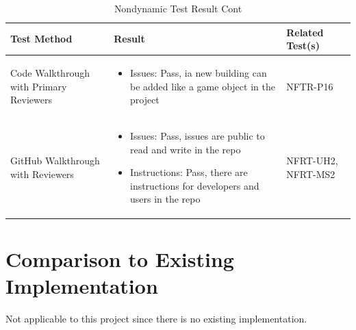 \documentclass[12pt, titlepage]{article}
\begin{document}
\begin{table}[H]
\caption{Nondynamic Test Result Cont}
\begin{tabular}{|p{0.3\linewidth} | p{0.5\linewidth}| p{0.2\linewidth} |}
\hline
\multicolumn{1}{|l}{\bfseries Test Method} & \multicolumn{1}{|l|}{\bfseries Result} & \multicolumn{1}{l|}{\bfseries Related Test(s)}\\
\hline
Code Walkthrough with Primary Reviewers & 
\begin{itemize}
\item Issues: Pass, ia new building can be added like a game object in the project
\end{itemize} & NFTR-P16\\
\hline
GitHub Walkthrough with Reviewers & 
\begin{itemize}
\item Issues: Pass, issues are public to read and write in the repo
\item Instructions: Pass, there are instructions for developers and users in the repo
\end{itemize} & NFRT-UH2, NFRT-MS2\\
\hline
\end{tabular}
\end{table}

\section{Comparison to Existing Implementation}	

Not applicable to this project since there is no existing implementation.
\end{document}
